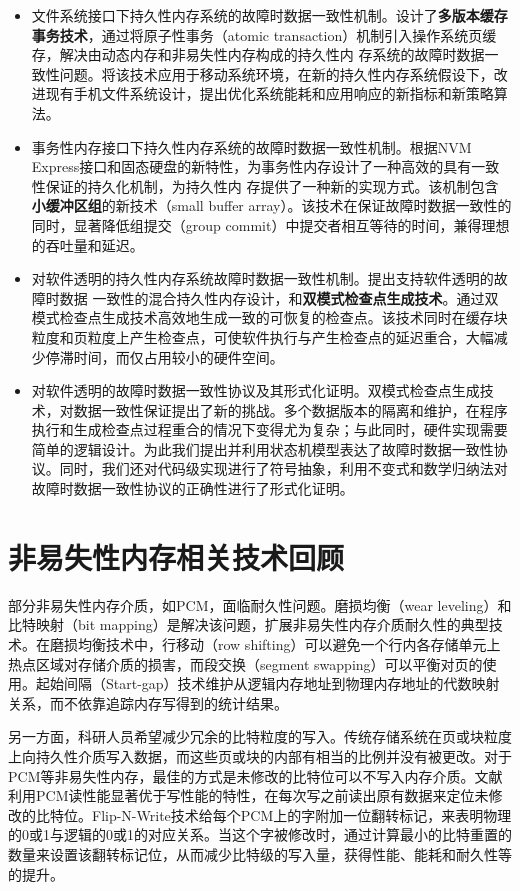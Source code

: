 \begin{itemize}
\item 文件系统接口下持久性内存系统的故障时数据一致性机制。设计了\textbf{多版本缓存事务技术}，通过将原子性事务（atomic transaction）机制引入操作系统页缓存，解决由动态内存和非易失性内存构成的持久性内
存系统的故障时数据一致性问题。将该技术应用于移动系统环境，在新的持久性内存系统假设下，改进现有手机文件系统设计，提出优化系统能耗和应用响应的新指标和新策略算法。
\item 事务性内存接口下持久性内存系统的故障时数据一致性机制。根据NVM Express\cite{nvme}接口和固态硬盘的新特性，为事务性内存设计了一种高效的具有一致性保证的持久化机制，为持久性内
存提供了一种新的实现方式。该机制包含\textbf{小缓冲区组}的新技术（small buffer array）。该技术在保证故障时数据一致性的同时，显著降低组提交（group commit）中提交者相互等待的时间，兼得理想的吞吐量和延迟。
\item 对软件透明的持久性内存系统故障时数据一致性机制。提出支持软件透明的故障时数据
一致性的混合持久性内存设计，和\textbf{双模式检查点生成技术}。通过双模式检查点生成技术高效地生成一致的可恢复的检查点。该技术同时在缓存块粒度和页粒度上产生检查点，可使软件执行与产生检查点的延迟重合，大幅减少停滞时间，而仅占用较小的硬件空间。
\item 对软件透明的故障时数据一致性协议及其形式化证明。双模式检查点生成技术，对数据一致性保证提出了新的挑战。多个数据版本的隔离和维护，在程序执行和生成检查点过程重合的情况下变得尤为复杂；与此同时，硬件实现需要简单的逻辑设计。为此我们提出并利用状态机模型表达了故障时数据一致性协议。同时，我们还对代码级实现进行了符号抽象，利用不变式和数学归纳法对故障时数据一致性协议的正确性进行了形式化证明。
\end{itemize}

\section{非易失性内存相关技术回顾}
\label{intro:nvm-review}

部分非易失性内存介质，如PCM，面临耐久性问题。磨损均衡（wear leveling）和比特映射（bit mapping）是解决该问题，扩展非易失性内存介质耐久性的典型技术。在磨损均衡技术中，行移动（row shifting）可以避免一个行内各存储单元上热点区域对存储介质的损害，而段交换（segment swapping）\cite{Qureshi:2009:SHP:1555754.1555760}可以平衡对页的使用\cite{Zhou:2009:DEE:1555754.1555759}。起始间隔（Start-gap）技术\cite{Qureshi:2009:SHP:1555754.1555760}维护从逻辑内存地址到物理内存地址的代数映射关系，而不依靠追踪内存写得到的统计结果。

另一方面，科研人员希望减少冗余的比特粒度的写入。传统存储系统在页或块粒度上向持久性介质写入数据，而这些页或块的内部有相当的比例并没有被更改。对于PCM等非易失性内存，最佳的方式是未修改的比特位可以不写入内存介质。文献\cite{Zhou:2009:DEE:1555754.1555759}利用PCM读性能显著优于写性能的特性，在每次写之前读出原有数据来定位未修改的比特位。Flip-N-Write\cite{5375405}技术给每个PCM上的字附加一位翻转标记，来表明物理的0或1与逻辑的0或1的对应关系。当这个字被修改时，通过计算最小的比特重置的数量来设置该翻转标记位，从而减少比特级的写入量，获得性能、能耗和耐久性等的提升。

